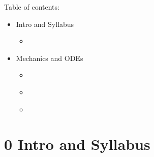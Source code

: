 \documentclass[letterpaper,10pt,english]{jupyterBook}
\begin{document}
\sphinxAtStartPar
Table of contents:
\begin{itemize}
\item {} 
 \sphinxhyphen{} Intro and Syllabus

\begin{itemize}
\item {} 
\sphinxAtStartPar
{\hyperref[\detokenize{content/0_course/0_syllabus::doc}]{}}

\end{itemize}
\end{itemize}
\begin{itemize}
\item {} 
 \sphinxhyphen{} Mechanics and ODEs

\begin{itemize}
\item {} 
\sphinxAtStartPar
{\hyperref[\detokenize{content/1_mechanics/modeling/what_is_modeling::doc}]{}}

\item {} 
\sphinxAtStartPar
{\hyperref[\detokenize{content/1_mechanics/modeling/activity-what_is_a_model::doc}]{}}

\item {} 
\sphinxAtStartPar
{\hyperref[\detokenize{content/1_mechanics/mechanics_intro::doc}]{}}

\end{itemize}
\end{itemize}

\sphinxstepscope


\part{0 \sphinxhyphen{} Intro and Syllabus}

\sphinxstepscope
\end{document}
